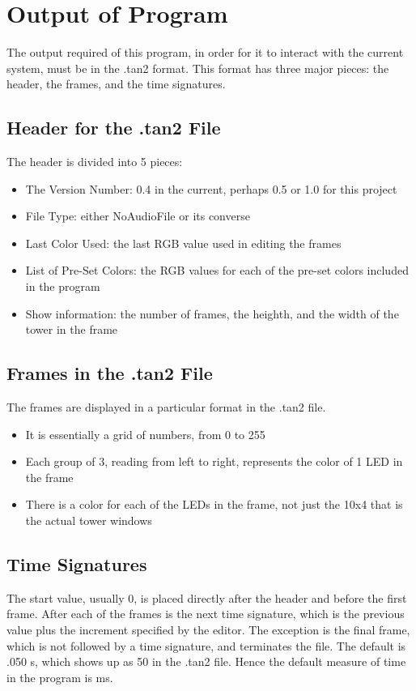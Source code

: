 
\section{Output of Program}
The output required of this program, in order for it to interact with the current system, must be in the .tan2 format.  This format has three major pieces: the header, the frames, and the time signatures.
\newline
\subsection{Header for the .tan2 File}
The header is divided into 5 pieces:
	\begin{itemize}
		\item The Version Number: 0.4 in the current, perhaps 0.5 or 1.0 for this project
		\item File Type: either NoAudioFile or its converse
		\item Last Color Used: the last RGB value used in editing the frames
		\item List of Pre-Set Colors: the RGB values for each of the pre-set colors included in the program
		\item Show information: the number of frames, the heighth, and the width of the tower in the frame
	\end{itemize}
\subsection{Frames in the .tan2 File}
The frames are displayed in a particular format in the .tan2 file.
	\begin{itemize}
		\item It is essentially a grid of numbers, from 0 to 255
		\item Each group of 3, reading from left to right, represents the color of 1 LED in the frame
		\item There is a color for each of the LEDs in the frame, not just the 10x4 that is the actual tower windows
	\end{itemize}

\subsection{Time Signatures}
The start value, usually 0, is placed directly after the header and before the first frame.  After each of the frames is the next time signature, which is the previous value plus the increment specified by the editor.  The exception is the final frame, which is not followed by a time signature, and terminates the file.  The default is .050 s, which shows up as 50 in the .tan2 file.  Hence the default measure of time in the program is ms.

